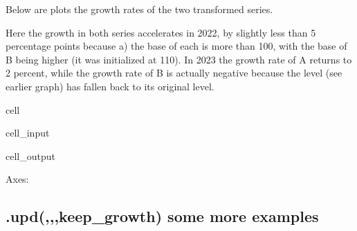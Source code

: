 \documentclass[letterpaper,10pt,english]{jupyterBook}
\begin{document}
\sphinxAtStartPar
Below are plots the growth rates of the two transformed series.

\sphinxAtStartPar
Here the growth in both series accelerates in 2022, by slightly less than 5 percentage points because a) the base of each is more than 100, with the base of B being higher (it was initialized at 110). In 2023 the growth rate of A returns to 2 percent, while the growth rate of B is actually negative because the level (see earlier graph) has fallen back to its original level.

\begin{sphinxuseclass}{cell}\begin{sphinxVerbatimInput}

\begin{sphinxuseclass}{cell_input}
\begin{sphinxVerbatim}[commandchars=\\\{\}]
\PYG{p}{[}\PYG{p}{[}\PYG{p}{]}\PYG{p}{]}
\end{sphinxVerbatim}

\end{sphinxuseclass}\end{sphinxVerbatimInput}
\begin{sphinxVerbatimOutput}

\begin{sphinxuseclass}{cell_output}
\begin{sphinxVerbatim}[commandchars=\\\{\}]
\PYGZlt{}Axes: \PYGZgt{}
\end{sphinxVerbatim}

\noindent{}

\end{sphinxuseclass}\end{sphinxVerbatimOutput}

\end{sphinxuseclass}

\subsection{.upd(,,,keep\_growth) some more examples}
\label{\detokenize{content/04_PythonEssentials/UpdateCommand:upd-keep-growth-some-more-examples}}
\end{document}
